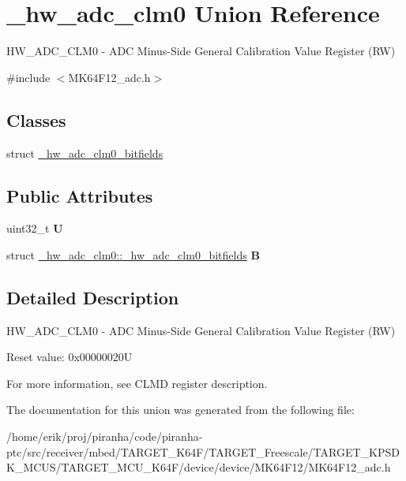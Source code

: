 \hypertarget{union__hw__adc__clm0}{}\section{\+\_\+hw\+\_\+adc\+\_\+clm0 Union Reference}
\label{union__hw__adc__clm0}


H\+W\+\_\+\+A\+D\+C\+\_\+\+C\+L\+M0 -\/ A\+DC Minus-\/\+Side General Calibration Value Register (RW)  




{\ttfamily \#include $<$M\+K64\+F12\+\_\+adc.\+h$>$}

\subsection*{Classes}
\begin{DoxyCompactItemize}
\item 
struct \hyperlink{struct__hw__adc__clm0_1_1__hw__adc__clm0__bitfields}{\+\_\+hw\+\_\+adc\+\_\+clm0\+\_\+bitfields}
\end{DoxyCompactItemize}
\subsection*{Public Attributes}
\begin{DoxyCompactItemize}
\item 
uint32\+\_\+t {\bfseries U}\hypertarget{union__hw__adc__clm0_a6f5ce4de801debb1c82ed198a1f8afb3}{}\label{union__hw__adc__clm0_a6f5ce4de801debb1c82ed198a1f8afb3}

\item 
struct \hyperlink{struct__hw__adc__clm0_1_1__hw__adc__clm0__bitfields}{\+\_\+hw\+\_\+adc\+\_\+clm0\+::\+\_\+hw\+\_\+adc\+\_\+clm0\+\_\+bitfields} {\bfseries B}\hypertarget{union__hw__adc__clm0_a40ffb68fcbdc852a638502a17979fb13}{}\label{union__hw__adc__clm0_a40ffb68fcbdc852a638502a17979fb13}

\end{DoxyCompactItemize}


\subsection{Detailed Description}
H\+W\+\_\+\+A\+D\+C\+\_\+\+C\+L\+M0 -\/ A\+DC Minus-\/\+Side General Calibration Value Register (RW) 

Reset value\+: 0x00000020U

For more information, see C\+L\+MD register description. 

The documentation for this union was generated from the following file\+:\begin{DoxyCompactItemize}
\item 
/home/erik/proj/piranha/code/piranha-\/ptc/src/receiver/mbed/\+T\+A\+R\+G\+E\+T\+\_\+\+K64\+F/\+T\+A\+R\+G\+E\+T\+\_\+\+Freescale/\+T\+A\+R\+G\+E\+T\+\_\+\+K\+P\+S\+D\+K\+\_\+\+M\+C\+U\+S/\+T\+A\+R\+G\+E\+T\+\_\+\+M\+C\+U\+\_\+\+K64\+F/device/device/\+M\+K64\+F12/M\+K64\+F12\+\_\+adc.\+h\end{DoxyCompactItemize}
